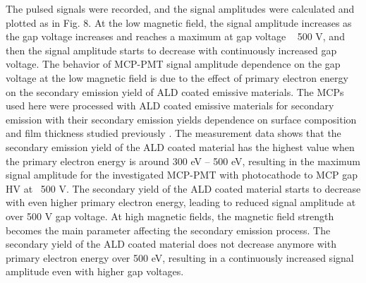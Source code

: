 \documentclass[preprint,5p]{elsarticle}
\begin{document}
The pulsed signals were recorded, and the signal amplitudes were calculated and 
plotted as in Fig. 8. At the low magnetic field, the signal amplitude increases 
as the gap voltage increases and reaches a maximum at gap voltage ~ 500 V, and 
then the signal amplitude starts to decrease with continuously increased gap 
voltage. The behavior of MCP-PMT signal amplitude dependence on the gap voltage 
at the low magnetic field is due to the effect of primary electron energy on 
the secondary emission yield of ALD coated emissive materials. The MCPs used here 
were processed with ALD coated emissive materials for secondary emission with their
secondary emission yields dependence on surface composition and film thickness
studied previously \cite{22}. The measurement data shows that 
the secondary emission yield of the ALD coated material has the highest value 
when the primary electron energy is around 300 eV – 500 eV, resulting in the 
maximum signal amplitude for the investigated MCP-PMT with photocathode to MCP 
gap HV at ~500 V. The secondary yield of the ALD coated material starts to 
decrease with even higher primary electron energy, leading to reduced signal 
amplitude at over 500 V gap voltage. At high magnetic fields, the magnetic 
field strength becomes the main parameter affecting the secondary emission 
process. The secondary yield of the ALD coated material does not decrease 
anymore with primary electron energy over 500 eV, resulting in a continuously 
increased signal amplitude even with higher gap voltages.
\end{document}
